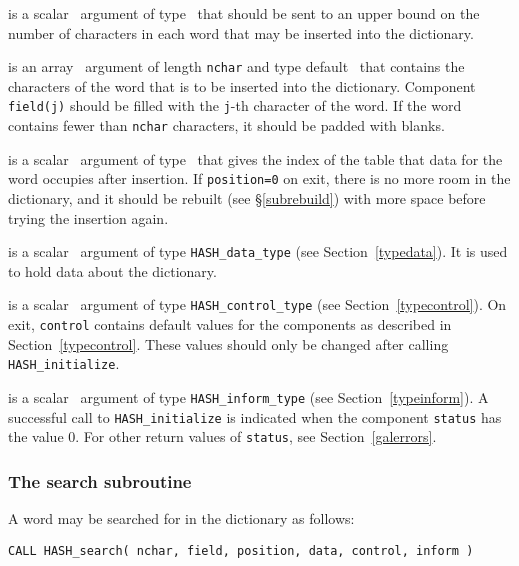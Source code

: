 \documentclass{galahad}
\newcommand{\packagename}{HASH}
\begin{document}
\vspace*{-2mm}
\begin{description}

 is a scalar \intentin\ argument of type \integer\ that
should be sent to an upper bound on the number of characters in each
word that may be inserted into the dictionary.

 is an array \intentin\ argument of length {\tt nchar} and 
type default \character\ that contains the characters of the word that 
is to be inserted into the dictionary.  
Component {\tt field(j)} should be filled with the {\tt j}-th 
character of the word. If the word contains fewer than {\tt nchar} characters,
it should be padded with blanks.

 is a scalar \intentout\ argument of type \integer\ that
gives the index of the table that data for the word occupies after insertion.
If {\tt position=0} on exit, there is no more room in the dictionary, and
it should be rebuilt (see \S\ref{subrebuild}) with more space before trying 
the insertion again.

 is a scalar \intentinout\ argument of type
{\tt \packagename\_data\_type}
(see Section~\ref{typedata}). It is used to hold data about the dictionary.

 is a scalar \intentin\ argument of type
{\tt \packagename\_control\_type}
(see Section~\ref{typecontrol}).
On exit, {\tt control} contains default values for the components as
described in Section~\ref{typecontrol}.
These values should only be changed after calling
{\tt \packagename\_initialize}.

 is a scalar \intentinout\ argument of type
{\tt \packagename\_inform\_type}
(see Section~\ref{typeinform}). A successful call to
{\tt \packagename\_initialize}
is indicated when the  component {\tt status} has the value 0.
For other return values of {\tt status}, see Section~\ref{galerrors}.

\end{description}


\subsubsection{The search subroutine}\label{subsearch}
A word may be searched for in the dictionary as follows:
\vspace*{1mm}

\hspace{8mm}
{\tt CALL \packagename\_search( nchar, field, position, data, control, inform )}
\end{document}
